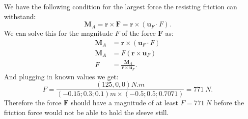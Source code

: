 \documentclass[a4paper]{article}
\begin{document}
We have the following condition for the largest force the resisting friction can withstand:
\[ 
\textbf{M}_{A} = \textbf{r} \times \textbf{F} = \textbf{r} \times \left( \textbf{u}_F \cdot F \right)
.\]
We can solve this for the magnitude $F$ of the force $\textbf{F}$ as:
\begin{align*}
  \textbf{M}_A &= \textbf{r} \times \left( \textbf{u}_F \cdot F \right) \\
  \textbf{M}_A &= F \left( \textbf{r} \times \textbf{u}_F \right) \\
  F &= \frac{\textbf{M}_A}{\textbf{r} \times \textbf{u}_F}
.\end{align*}
And plugging in known values we get:
\[ 
F = \frac{\left( 125, 0, 0 \right) \unit{N.m}}{\left( - \num{0,15} ; \num{0,3} ; \num{0,1}  \right)\unit{m} \times \left( -\num{0,5} ; \num{0,5} ; \num{0,7071}  \right)} = \qty{771}{N}
.\]
Therefore the force $\textbf{F}$ should have a magnitude of at least $F = \qty{771}{N}$ before the friction force would not be able to hold the sleeve still. 
\end{document}
